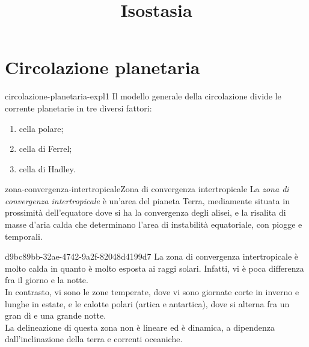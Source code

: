 \documentclass[preview]{standalone}
\begin{document}
\title{Isostasia}
\genpage

\section{Circolazione planetaria}


\begin{snippet}{circolazione-planetaria-expl1}
    Il modello generale della circolazione divide le corrente planetarie in tre diversi fattori:
    \begin{enumerate}
        \item cella polare;
        \item cella di Ferrel;
        \item cella di Hadley.
    \end{enumerate}
\end{snippet}




\begin{snippetdefinition}{zona-convergenza-intertropicale}{Zona di convergenza intertropicale}
    La \textit{zona di convergenza intertropicale} è un'area del pianeta Terra, mediamente situata in prossimità dell'equatore
    dove si ha la convergenza degli alisei, e la risalita di masse d'aria calda che determinano l'area di instabilità equatoriale, con piogge e temporali.
\end{snippetdefinition}

\begin{snippet}{d9bc89bb-32ae-4742-9a2f-82048d4199d7}
    La zona di convergenza intertropicale è molto calda in quanto è molto esposta ai raggi solari.
    Infatti, vi è poca differenza fra il giorno e la notte.
    \\
    In contrasto, vi sono le zone temperate, dove vi sono giornate corte in inverno e lunghe
    in estate, e le calotte polari (artica e antartica), dove si alterna fra un gran dì e una grande notte.
    \\
    La delineazione di questa zona non è lineare ed è dinamica, a dipendenza dall'inclinazione della terra
    e correnti oceaniche.
\end{snippet}
\end{document}
